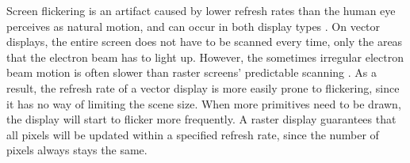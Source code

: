 Screen flickering is an artifact caused by lower refresh rates than the human eye perceives as natural motion, and can occur in both display types \cite{flicker}.
On vector displays, the entire screen does not have to be scanned every time, only the areas that the electron beam has to light up.
However, the sometimes irregular electron beam motion is often slower than raster screens' predictable scanning \cite{vecvsras}.
As a result, the refresh rate of a vector display is more easily prone to flickering, since it has no way of limiting the scene size.
When more primitives need to be drawn, the display will start to flicker more frequently.
A raster display guarantees that all pixels will be updated within a specified refresh rate, since the number of pixels always stays the same.
